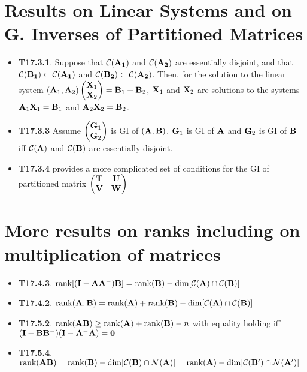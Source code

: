 \documentclass[a4paper, oneside]{book}
\begin{document}
\section{Results on Linear Systems and on G. Inverses of Partitioned Matrices}
\begin{itemize}
\item \textbf{T17.3.1}. Suppose that $\mathcal{C}(\mathbf{A_1})$ and $\mathcal{C}(\mathbf{A_2})$ are essentially disjoint, and that $\mathcal{C}(\mathbf{B_1})\subset\mathcal{C}(\mathbf{A_1})$ and $\mathcal{C}(\mathbf{B_2})\subset\mathcal{C}(\mathbf{A_2})$. Then, for the solution to the linear system $(\mathbf A_1, \mathbf A_2)\left( \begin{matrix}\mathbf X_1\\\mathbf X_2\end{matrix} \right)=\mathbf B_1 + \mathbf B_2$, $\mathbf X_1$ and  $\mathbf X_2$ are solutions to the systems $\mathbf {A}_1 \mathbf X_1 = \mathbf B_1$ and $\mathbf {A}_2 \mathbf X_2 = \mathbf B_2$.
\item \textbf{T17.3.3} Assume $\left( \begin{matrix}\mathbf G_1 \\ \mathbf G_2\end{matrix}\right)$ is GI of $(\mathbf{A,B})$. $\mathbf G_1$ is GI of $\mathbf A$ and $\mathbf G_2$ is GI of $\mathbf B$ iff $\mathcal{C}(\mathbf{A})$ and $\mathcal{C}(\mathbf{B})$ are essentially disjoint. 
\item \textbf{T17.3.4} provides a more complicated set of conditions for the GI of partitioned matrix $\left(\begin{matrix}\mathbf {T} & \mathbf{U} \\ \mathbf {V} & \mathbf{W}\end{matrix} \right)$
\end{itemize}

\section{More results on ranks including on multiplication of matrices}
\begin{itemize}
\item \textbf{T17.4.3}. $\text{rank}[(\mathbf{I-AA^-})\mathbf B] = \text{rank}(\mathbf B)-\dim[\mathcal{C}(\mathbf{A})\cap\mathcal{C}(\mathbf{B})]$
\item \textbf{T17.4.2}. $\text{rank}(\mathbf{A,B}) = \text{rank} (\mathbf A)+\text{rank}(\mathbf B)-\dim[\mathcal{C}(\mathbf{A})\cap\mathcal{C}(\mathbf{B})]$
\item \textbf{T17.5.2}. $\text{rank}(\mathbf{AB}) \ge \text{rank} (\mathbf A) + \text{rank}(\mathbf B) - n$ with equality holding iff $\mathbf{(I-BB^-)(I-A^-A)=0}$
\item \textbf{T17.5.4}.  $\text{rank}(\mathbf {AB}) = \text{rank}(\mathbf B)-\dim[\mathcal{C}(\mathbf{B})\cap \mathcal N(\mathbf A)] = \text{rank}(\mathbf A)-\dim[\mathcal{C}(\mathbf{B'})\cap \mathcal N(\mathbf A')]$
\end{itemize}
\end{document}
